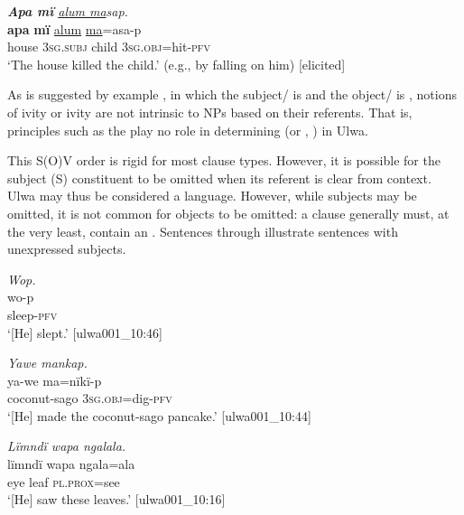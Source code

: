 \ea%
    \label{ex:clause:9}
            \textit{\textbf{Apa mï} \underline{alum ma}sap.}\\
\gll    \textbf{apa}  \textbf{mï}      \underline{alum}  \underline{ma}=asa-p\\
    house  \textsc{3sg.subj}  child  3\textsc{sg.obj}=hit-\textsc{pfv}\\
\glt `The house killed the child.’ (e.g., by falling on him) [elicited]
\z


  As is suggested by example , in which the subject/ is  and the object/ is , notions of ivity or ivity are not intrinsic to NPs based on their referents. That is, principles such as the  \label{ref:RNDui1Xjf4uVA}\citep{Silverstein1976} play no role in determining  (or , ) in Ulwa.

  This S(O)V order is rigid for most clause types. However, it is possible for the subject (S) constituent to be omitted when its referent is clear from context. Ulwa may thus be considered a  language. However, while subjects may be omitted, it is not common for objects to be omitted: a  clause generally must, at the very least, contain an  . Sentences  through  illustrate sentences with unexpressed subjects.

\ea%
    \label{ex:clause:10}
          \textit{Wop.}\\
\gll    wo-p\\
    sleep-\textsc{pfv}\\
\glt `[He] slept.’ [ulwa001\_10:46]
\z

\ea%
    \label{ex:clause:11}
          \textit{Yawe mankap.}\\
\gll    ya-we      ma=nïkï-p\\
    coconut-sago  \textsc{3sg.obj}=dig{}-\textsc{pfv}\\
\glt `[He] made the coconut-sago pancake.’ [ulwa001\_10:44]
\z

\ea%
    \label{ex:clause:12}
          \textit{Lïmndï wapa ngalala.}\\
\gll    lïmndï  wapa  ngala=ala\\
    eye    leaf  \textsc{pl.prox=}see\\
\glt `[He] saw these leaves.’ [ulwa001\_10:16]
\z

